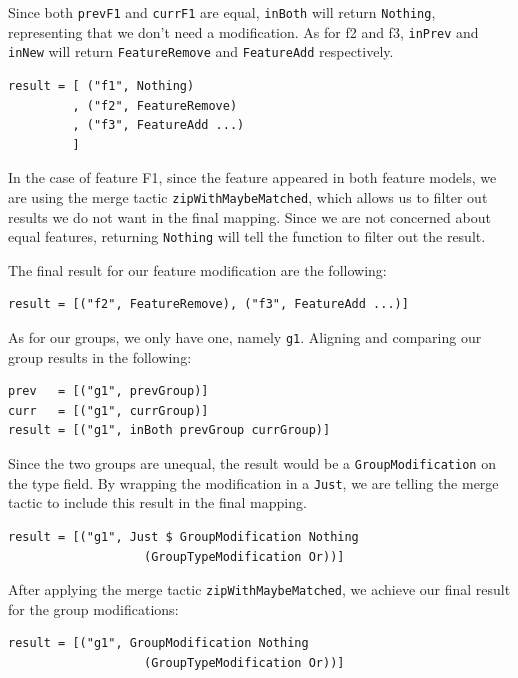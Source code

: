 \documentclass[a4paper,english]{ifimaster}
\begin{document}
Since both \texttt{prevF1} and \texttt{currF1} are equal, \texttt{inBoth} will return \texttt{Nothing}, representing that we don't need a modification. As for f2 and f3, \texttt{inPrev} and \texttt{inNew} will return \texttt{FeatureRemove} and \texttt{FeatureAdd} respectively.

\begin{verbatim}
result = [ ("f1", Nothing)
         , ("f2", FeatureRemove)
         , ("f3", FeatureAdd ...)
         ]
\end{verbatim}

In the case of feature F1, since the feature appeared in both feature models, we are using the merge tactic \texttt{zipWithMaybeMatched}, which allows us to filter out results we do not want in the final mapping. Since we are not concerned about equal features, returning \texttt{Nothing} will tell the function to filter out the result.

The final result for our feature modification are the following:

\begin{verbatim}
result = [("f2", FeatureRemove), ("f3", FeatureAdd ...)]
\end{verbatim}

As for our groups, we only have one, namely \texttt{g1}. Aligning and comparing our group results in the following:

\begin{verbatim}
prev   = [("g1", prevGroup)]
curr   = [("g1", currGroup)]
result = [("g1", inBoth prevGroup currGroup)]
\end{verbatim}

Since the two groups are unequal, the result would be a \texttt{GroupModification} on the type field. By wrapping the modification in a \texttt{Just}, we are telling the merge tactic to include this result in the final mapping.

\begin{verbatim}
result = [("g1", Just $ GroupModification Nothing 
                   (GroupTypeModification Or))]
\end{verbatim}

After applying the merge tactic \texttt{zipWithMaybeMatched}, we achieve our final result for the group modifications:

\begin{verbatim}
result = [("g1", GroupModification Nothing 
                   (GroupTypeModification Or))]
\end{verbatim}
\end{document}
